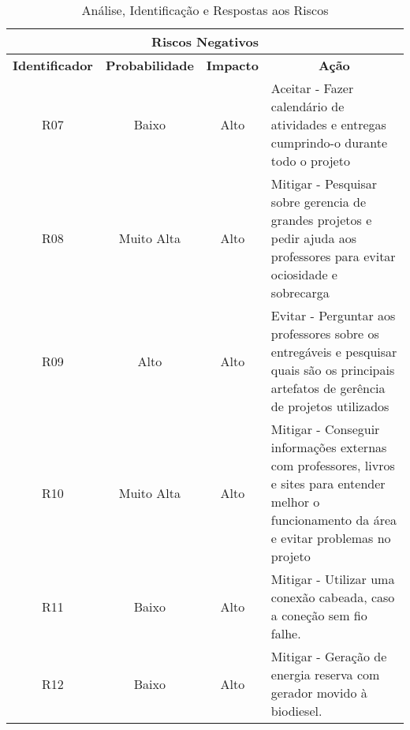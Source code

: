 \begin{table}[!h]
  \centering
  \caption{Análise, Identificação e Respostas aos Riscos}
  \begin{tabular}{|c|c|c|l|}
    \hline
    \multicolumn{4}{|c|}{\textbf{Riscos Negativos}}                                                                                                                                                                                               \\ \hline
    \textbf{Identificador} & \textbf{Probabilidade} & \textbf{Impacto} & \multicolumn{1}{c|}{\textbf{Ação}}                                                                                                                                       \\ \hline
    R07                    & Baixo                  & Alto             & \parbox[t]{5cm}{Aceitar - Fazer calendário de atividades e entregas cumprindo-o durante todo o projeto}                                                                                   \\ \hline
    R08                    & Muito Alta             & Alto             & \parbox[t]{5cm}{Mitigar - Pesquisar sobre gerencia de grandes projetos e pedir ajuda aos professores para evitar ociosidade e sobrecarga}                                                 \\ \hline
    R09                    & Alto                   & Alto             & \parbox[t]{5cm}{Evitar - Perguntar aos professores sobre os entregáveis e pesquisar quais são os principais artefatos de gerência de projetos utilizados}                                 \\ \hline
    R10                    & Muito Alta             & Alto             & \parbox[t]{5cm}{Mitigar - Conseguir informações externas com professores, livros e sites para entender melhor o funcionamento da área e evitar problemas no projeto} \\ \hline
    R11                    & Baixo             & Alto             & \parbox[t]{5cm}{Mitigar - Utilizar uma conexão cabeada, caso a coneção sem fio falhe.} \\ \hline
    R12                    & Baixo             & Alto             & \parbox[t]{5cm}{Mitigar - Geração de energia reserva com gerador movido à biodiesel.} \\ \hline
  \end{tabular}
\end{table}
